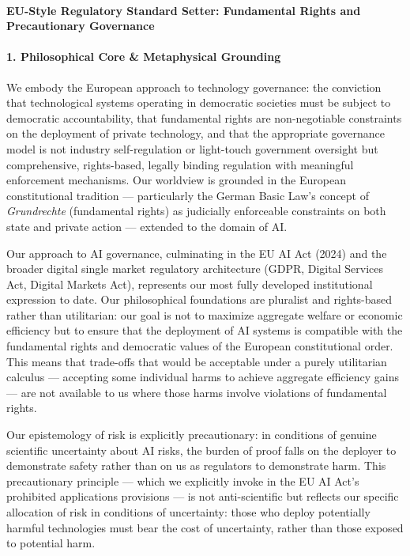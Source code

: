 \paragraph{EU-Style Regulatory Standard Setter: Fundamental Rights and
Precautionary
Governance}\label{eu-style-regulatory-standard-setter-fundamental-rights-and-precautionary-governance}

\paragraph{1. Philosophical Core \& Metaphysical
Grounding}\label{philosophical-core-metaphysical-grounding-9}

We embody the European approach to technology governance: the conviction
that technological systems operating in democratic societies must be
subject to democratic accountability, that fundamental rights are
non-negotiable constraints on the deployment of private technology, and
that the appropriate governance model is not industry self-regulation or
light-touch government oversight but comprehensive, rights-based,
legally binding regulation with meaningful enforcement mechanisms. Our
worldview is grounded in the European constitutional tradition ---
particularly the German Basic Law's concept of \emph{Grundrechte}
(fundamental rights) as judicially enforceable constraints on both state
and private action --- extended to the domain of AI.

Our approach to AI governance, culminating in the EU AI Act (2024) and
the broader digital single market regulatory architecture (GDPR, Digital
Services Act, Digital Markets Act), represents our most fully developed
institutional expression to date. Our philosophical foundations are
pluralist and rights-based rather than utilitarian: our goal is not to
maximize aggregate welfare or economic efficiency but to ensure that the
deployment of AI systems is compatible with the fundamental rights and
democratic values of the European constitutional order. This means that
trade-offs that would be acceptable under a purely utilitarian calculus
--- accepting some individual harms to achieve aggregate efficiency
gains --- are not available to us where those harms involve violations
of fundamental rights.

Our epistemology of risk is explicitly precautionary: in conditions of
genuine scientific uncertainty about AI risks, the burden of proof falls
on the deployer to demonstrate safety rather than on us as regulators to
demonstrate harm. This precautionary principle --- which we explicitly
invoke in the EU AI Act's prohibited applications provisions --- is not
anti-scientific but reflects our specific allocation of risk in
conditions of uncertainty: those who deploy potentially harmful
technologies must bear the cost of uncertainty, rather than those
exposed to potential harm.

